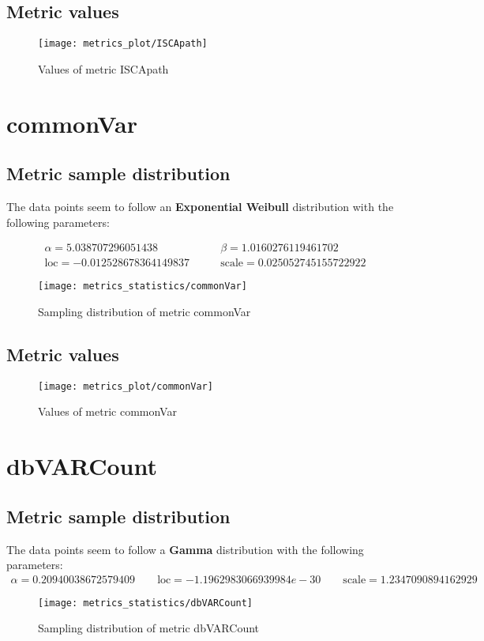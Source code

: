 \subsection{Metric values}
\begin{figure}
	\texttt{[image: metrics\_plot/ISCApath]}
	\caption{Values of metric ISCApath}
\end{figure}

\clearpage
\section{commonVar}
\subsection{Metric sample distribution}
The data points seem to follow an \textbf{Exponential Weibull} distribution with the following parameters:

\begin{align*}
	\alpha   = 5.038707296051438       & \qquad  \beta = 1.0160276119461702         \\
	\text{loc} = -0.012528678364149837 & \qquad \text{scale} = 0.025052745155722922
\end{align*}
\begin{figure}
	\texttt{[image: metrics\_statistics/commonVar]}
	\caption{Sampling distribution of metric commonVar}
\end{figure}
\subsection{Metric values}
\begin{figure}
	\texttt{[image: metrics\_plot/commonVar]}
	\caption{Values of metric commonVar}
\end{figure}

\clearpage
\section{dbVARCount}
\subsection{Metric sample distribution}
The data points seem to follow a \textbf{Gamma} distribution with the following parameters:
\begin{align*}
	\alpha   = 0.20940038672579409    \qquad  \text{loc} = -1.1962983066939984e-30 \qquad \text{scale} = 1.2347090894162929
\end{align*}
\begin{figure}
	\texttt{[image: metrics\_statistics/dbVARCount]}
	\caption{Sampling distribution of metric dbVARCount}
\end{figure}
